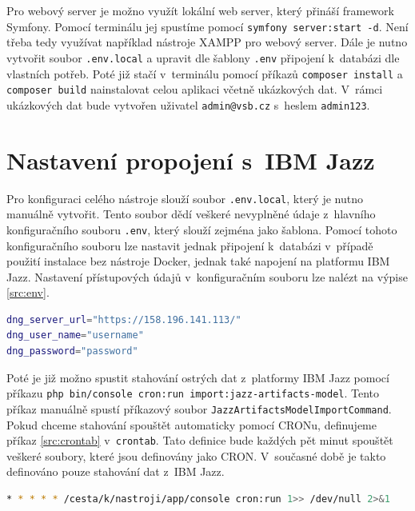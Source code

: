 \documentclass[czech,master]{diploma}
\begin{document}
Pro webový server je možno využít lokální web server, který přináší framework Symfony. Pomocí terminálu jej spustíme pomocí \texttt{symfony server:start -d}. Není třeba tedy využívat například nástroje XAMPP pro webový server. Dále je nutno vytvořit soubor \texttt{.env.local} a upravit dle šablony \texttt{.env} připojení k~databázi dle vlastních potřeb. Poté již stačí v~terminálu pomocí příkazů \texttt{composer install} a \texttt{composer build} nainstalovat celou aplikaci včetně ukázkových dat. V~rámci ukázkových dat bude vytvořen uživatel \texttt{admin@vsb.cz} s~heslem \texttt{admin123}.

\chapter{Nastavení propojení s~IBM Jazz}
Pro konfiguraci celého nástroje slouží soubor \texttt{.env.local}, který je nutno manuálně vytvořit. Tento soubor dědí veškeré nevyplněné údaje z~hlavního konfiguračního souboru \texttt{.env}, který slouží zejména jako šablona. Pomocí tohoto konfiguračního souboru lze nastavit jednak připojení k~databázi v~případě použití instalace bez nástroje Docker, jednak také napojení na platformu IBM Jazz. Nastavení přístupových údajů v~konfiguračním souboru lze nalézt na výpise \ref{src:env}.

\begin{lstlisting}[language=bash,label=src:env,caption={Část konfiguračního souboru \texttt{.env.local} definující propojení s~IBM Jazz}]
dng_server_url="https://158.196.141.113/"
dng_user_name="username"
dng_password="password"
\end{lstlisting}

Poté je již možno spustit stahování ostrých dat z~platformy IBM Jazz pomocí příkazu \texttt{php bin/console cron:run import:jazz-artifacts-model}. Tento příkaz manuálně spustí příkazový soubor \texttt{JazzArtifactsModelImportCommand}. Pokud chceme stahování spouštět automaticky pomocí CRONu, definujeme příkaz \ref{src:crontab} v~\texttt{crontab}. Tato definice bude každých pět minut spouštět veškeré soubory, které jsou definovány jako CRON. V~současné době je takto definováno pouze stahování dat z~IBM Jazz.

\begin{lstlisting}[language=bash,label=src:crontab,caption={Definice pro automatizaci stahování dat z~IBM Jazz pomocí CRONu}]
* * * * * /cesta/k/nastroji/app/console cron:run 1>> /dev/null 2>&1
\end{lstlisting}
\end{document}
